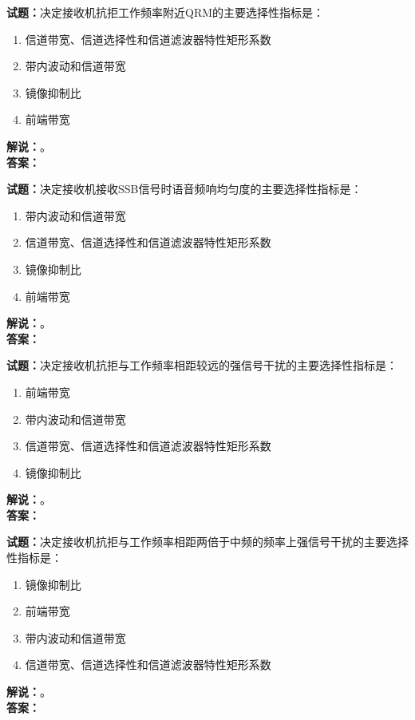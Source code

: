 \documentclass{ctexbook}
\begin{document}
\vspace{\baselineskip}

\noindent\textbf{试题：}决定接收机抗拒工作频率附近QRM的主要选择性指标是：
\begin{enumerate}[leftmargin=3em]
  \item 信道带宽、信道选择性和信道滤波器特性矩形系数
  \item 带内波动和信道带宽
  \item 镜像抑制比
  \item 前端带宽
\end{enumerate}
\noindent\textbf{解说：}\textbf{}。\\\noindent\textbf{答案：}

\vspace{\baselineskip}

\noindent\textbf{试题：}决定接收机接收SSB信号时语音频响均匀度的主要选择性指标是：
\begin{enumerate}[leftmargin=3em]
  \item 带内波动和信道带宽
  \item 信道带宽、信道选择性和信道滤波器特性矩形系数
  \item 镜像抑制比
  \item 前端带宽
\end{enumerate}
\noindent\textbf{解说：}\textbf{}。\\\noindent\textbf{答案：}

\vspace{\baselineskip}

\noindent\textbf{试题：}决定接收机抗拒与工作频率相距较远的强信号干扰的主要选择性指标是：
\begin{enumerate}[leftmargin=3em]
  \item 前端带宽
  \item 带内波动和信道带宽
  \item 信道带宽、信道选择性和信道滤波器特性矩形系数
  \item 镜像抑制比
\end{enumerate}
\noindent\textbf{解说：}\textbf{}。\\\noindent\textbf{答案：}

\vspace{\baselineskip}

\noindent\textbf{试题：}决定接收机抗拒与工作频率相距两倍于中频的频率上强信号干扰的主要选择性指标是：
\begin{enumerate}[leftmargin=3em]
  \item 镜像抑制比
  \item 前端带宽
  \item 带内波动和信道带宽
  \item 信道带宽、信道选择性和信道滤波器特性矩形系数
\end{enumerate}
\noindent\textbf{解说：}\textbf{}。\\\noindent\textbf{答案：}
\end{document}
